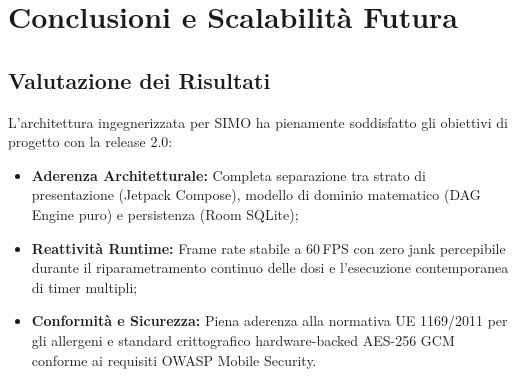 \documentclass[11pt,a4paper,titlepage]{article}
\begin{document}
\newpage

\section{Conclusioni e Scalabilit\`a Futura}
\subsection{Valutazione dei Risultati}
L'architettura ingegnerizzata per SIMO ha pienamente soddisfatto gli obiettivi di progetto con la release 2.0:
\begin{itemize}[leftmargin=*]
    \item \textbf{Aderenza Architetturale:} Completa separazione tra strato di presentazione (Jetpack Compose), modello di dominio matematico (DAG Engine puro) e persistenza (Room SQLite);
    \item \textbf{Reattivit\`a Runtime:} Frame rate stabile a 60\,FPS con zero jank percepibile durante il riparametramento continuo delle dosi e l'esecuzione contemporanea di timer multipli;
    \item \textbf{Conformit\`a e Sicurezza:} Piena aderenza alla normativa UE 1169/2011 per gli allergeni e standard crittografico hardware-backed AES-256 GCM conforme ai requisiti OWASP Mobile Security.
\end{itemize}
\end{document}
